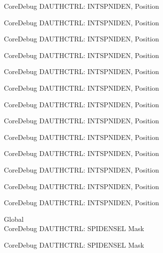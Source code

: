 \begin{DoxyRefList}
\label{deprecated__deprecated000278}%
%
Core\+Debug DAUTHCTRL\+: INTSPNIDEN, Position 

\label{deprecated__deprecated000357}%
%
Core\+Debug DAUTHCTRL\+: INTSPNIDEN, Position 

\label{deprecated__deprecated000433}%
%
Core\+Debug DAUTHCTRL\+: INTSPNIDEN, Position 

\label{deprecated__deprecated000536}%
%
Core\+Debug DAUTHCTRL\+: INTSPNIDEN, Position 

\label{deprecated__deprecated000638}%
%
Core\+Debug DAUTHCTRL\+: INTSPNIDEN, Position 

\label{deprecated__deprecated000763}%
%
Core\+Debug DAUTHCTRL\+: INTSPNIDEN, Position 

\label{deprecated__deprecated000817}%
%
Core\+Debug DAUTHCTRL\+: INTSPNIDEN, Position 

\label{deprecated__deprecated000893}%
%
Core\+Debug DAUTHCTRL\+: INTSPNIDEN, Position 

\label{deprecated__deprecated000956}%
%
Core\+Debug DAUTHCTRL\+: INTSPNIDEN, Position 

\label{deprecated__deprecated001035}%
%
Core\+Debug DAUTHCTRL\+: INTSPNIDEN, Position 

\label{deprecated__deprecated001111}%
%
Core\+Debug DAUTHCTRL\+: INTSPNIDEN, Position 

\label{deprecated__deprecated001214}%
%
Core\+Debug DAUTHCTRL\+: INTSPNIDEN, Position 

\label{deprecated__deprecated001316}%
%
Core\+Debug DAUTHCTRL\+: INTSPNIDEN, Position  
\item[Global \doxylink{group___c_m_s_i_s___s_c_b_gaa043fd13768d57be320c682ca1c9b234}{Core\+Debug\+\_\+\+DAUTHCTRL\+\_\+\+SPIDENSEL\+\_\+\+Msk} ]\hfill \\
\label{deprecated__deprecated000092}%
%
Core\+Debug DAUTHCTRL\+: SPIDENSEL Mask 

\label{deprecated__deprecated000146}%
%
Core\+Debug DAUTHCTRL\+: SPIDENSEL Mask 


\end{DoxyRefList}
